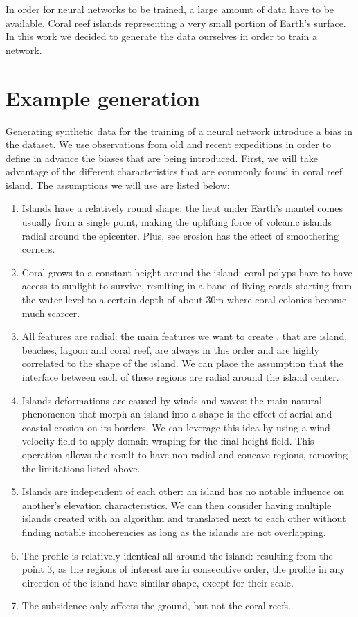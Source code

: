 In order for neural networks to be trained, a large amount of data have to be available. Coral reef islands representing a very small portion of  Earth's surface. In this work we decided to generate the data ourselves in order to train a network. 

\section{Example generation}
\label{sec:coral-island_example-generation}
Generating synthetic data for the training of a neural network introduce a bias in the dataset. We use observations from old and recent expeditions in order to define in advance the biases that are being introduced. First, we will take advantage of the different characteristics that are commonly found in coral reef island. The assumptions we will use are listed below:
\begin{enumerate}
    \item Islands have a relatively round shape: the heat under Earth's mantel comes usually from a single point, making the uplifting force of volcanic islands radial around the epicenter. Plus, see erosion has the effect of smoothering corners.
    \item Coral grows to a constant height around the island: coral polyps have to have access to sunlight to survive, resulting in a band of living corals starting from the water level to a certain depth of about 30m where coral colonies become much scarcer. 
    \item All features are radial: the main features we want to create , that are island, beaches, lagoon and coral reef, are always in this order and are highly correlated to the shape of the island. We can place the assumption that the interface between each of these regions are radial around the island center.
    \item Islands deformations are caused by winds and waves: the main natural phenomenon that morph an island into a shape is the effect of aerial and coastal erosion on its borders. We can leverage this idea by using a wind velocity field to apply domain wraping for the final height field. This operation allows the result to have non-radial and concave regions, removing the limitations listed above.
    \item Islands are independent of each other: an island has no notable influence on another's elevation characteristics. We can then consider having multiple islands created with an algorithm and translated next to each other without finding notable incoherencies as long as the islands are not overlapping.
    \item The profile is relatively identical all around the island: resulting from the point 3, as the regions of interest are in consecutive order, the profile in any direction of the island have similar shape, except for their scale.
    \item The subsidence only affects the ground, but not the coral reefs.
\end{enumerate}

